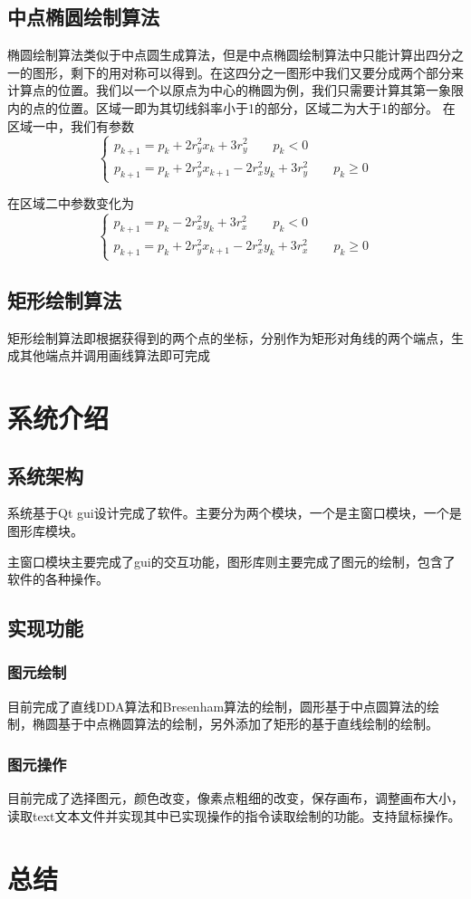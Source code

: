 \documentclass[a4paper,UTF8]{article}
\theoremstyle{definition}
\begin{document}
\subsection{中点椭圆绘制算法}
椭圆绘制算法类似于中点圆生成算法，但是中点椭圆绘制算法中只能计算出四分之一的图形，剩下的用对称可以得到。在这四分之一图形中我们又要分成两个部分来计算点的位置。我们以一个以原点为中心的椭圆为例，我们只需要计算其第一象限内的点的位置。区域一即为其切线斜率小于1的部分，区域二为大于1的部分。
在区域一中，我们有参数
\begin{equation}
\left\{
\begin{aligned}
p_{k+1}=p_{k}+2r_{y}^2 x_{k}+3 r_{y}^2 \qquad p_{k}<0\\
p_{k+1}=p_{k}+2r_{y}^2x_{k+1}-2r_{x}^2 y_{k}+3 r_{y}^2 \qquad p_{k}\geq 0
\end{aligned}
\right.
\end{equation}
\par 在区域二中参数变化为
\begin{equation}
\left\{
\begin{aligned}
p_{k+1}=p_{k}-2r_{x}^2 y_{k}+3 r_{x}^2 \qquad p_{k}<0\\
p_{k+1}=p_{k}+2r_{y}^2x_{k+1}-2r_{x}^2 y_{k}+3 r_{x}^2 \qquad p_{k}\geq 0
\end{aligned}
\right.
\end{equation}
\subsection{矩形绘制算法}
矩形绘制算法即根据获得到的两个点的坐标，分别作为矩形对角线的两个端点，生成其他端点并调用画线算法即可完成
\section{系统介绍}
\subsection{系统架构}
系统基于Qt gui设计完成了软件。主要分为两个模块，一个是主窗口模块，一个是图形库模块。
\par 主窗口模块主要完成了gui的交互功能，图形库则主要完成了图元的绘制，包含了软件的各种操作。

\subsection{实现功能}
\subsubsection{图元绘制}
目前完成了直线DDA算法和Bresenham算法的绘制，圆形基于中点圆算法的绘制，椭圆基于中点椭圆算法的绘制，另外添加了矩形的基于直线绘制的绘制。
\subsubsection{图元操作}
目前完成了选择图元，颜色改变，像素点粗细的改变，保存画布，调整画布大小，读取text文本文件并实现其中已实现操作的指令读取绘制的功能。支持鼠标操作。
\section{总结}

%

\end{document}

